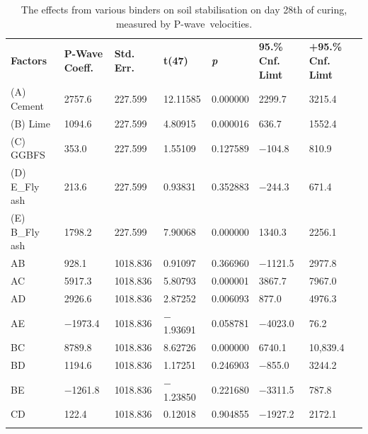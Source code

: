 \documentclass[materials,article,accept,pdftex,moreauthors]{Definitions/mdpi}
\begin{document}
 \begin{table}[H]
 \renewcommand{\arraystretch}{1.3}
 \tablesize{\footnotesize}
\caption{The effects from various binders on soil stabilisation on day {28}th of curing, measured by P-wave~velocities.}\label{tab:5}
\begin{tabularx}{\textwidth}{CCCCCCC}
\toprule
	     \textbf{Factors} &\textbf{ P-Wave Coeff.} & \textbf{Std. Err. }& \textbf{t(47)} & \textbf{\emph{p}} & \boldmath{$-$}\textbf{95.\% Cnf. Limt} & \textbf{+95.\% Cnf. Limt} \\ 
         (A) Cement & 2757.6 & 227.599 & 12.11585 & 0.000000 & 2299.7 & 3215.4 \\ 
         (B) Lime & 1094.6 & 227.599 & 4.80915 & 0.000016 & 636.7 & 1552.4 \\ 
        (C) GGBFS & 353.0 & 227.599 & 1.55109 & 0.127589 & $-$104.8 & 810.9 \\ 
        (D) E\_Fly ash & 213.6 & 227.599 & 0.93831 & 0.352883 & $-$244.3 & 671.4 \\ 
         (E) B\_Fly ash & 1798.2 & 227.599 & 7.90068 & 0.000000 & 1340.3 & 2256.1 \\ 
        AB & 928.1 & 1018.836 & 0.91097 & 0.366960 & $-$1121.5 & 2977.8 \\ 
         AC & 5917.3 & 1018.836 & 5.80793 & 0.000001 & 3867.7 & 7967.0 \\ 
         AD & 2926.6 & 1018.836 & 2.87252 & 0.006093 & 877.0 & 4976.3 \\ 
        AE & $-$1973.4 & 1018.836 & $-$1.93691 & 0.058781 & $-$4023.0 & 76.2 \\ 
         BC & 8789.8 & 1018.836 & 8.62726 & 0.000000 & 6740.1 & 10,839.4 \\ 
        BD & 1194.6 & 1018.836 & 1.17251 & 0.246903 & $-$855.0 & 3244.2 \\ 
        BE & $-$1261.8 & 1018.836 & $-$1.23850 & 0.221680 & $-$3311.5 & 787.8 \\ 
        CD & 122.4 & 1018.836 & 0.12018 & 0.904855 & $-$1927.2 & 2172.1 \\ 

\end{tabularx}
\end{table}
\end{document}
